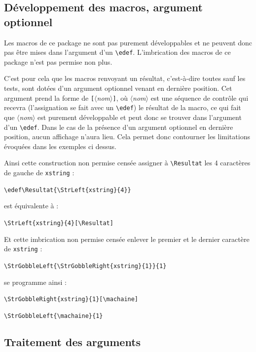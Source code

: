 \documentclass[a4paper,10pt,french]{article}
\newcommand\argu[1]{$\langle$\textit{#1}$\rangle$}
\newcommand\arguC[1]{\texttt{\color{black}[}\argu{#1}\texttt{\color{black}]}}
\begin{document}
\subsection{Développement des macros, argument optionnel}
\label{argumentoptionnel}
Les macros de ce package ne sont pas purement développables et ne peuvent donc pas être mises dans l'argument d'un \verb|\edef|. L'imbrication des macros de ce package n'est pas permise non plus.\medskip

C'est pour cela que les macros renvoyant un résultat, c'est-à-dire toutes sauf les tests, sont dotées d'un argument optionnel venant en dernière position. Cet argument prend la forme de \arguC{nom}, où \argu{nom} est une séquence de contrôle qui recevra (l'assignation se fait avec un \verb|\edef|) le résultat de la macro, ce qui fait que \argu{nom} est purement développable et peut donc se trouver dans l'argument d'un \verb|\edef|. Dans le cas de la présence d'un argument optionnel en dernière position, aucun affichage n'aura lieu. Cela permet donc contourner les limitations évoquées dans les exemples ci dessus.\medskip

Ainsi cette construction non permise censée assigner à \verb|\Resultat| les 4 caractères de gauche de \verb|xstring| :\par\nobreak
\hspace{0.2\linewidth}\verb|\edef\Resultat{\StrLeft{xstring}{4}}|\par\nobreak
\qquad est équivalente à :\par\nobreak
\hspace{0.2\linewidth}\verb|\StrLeft{xstring}{4}[\Resultat]|\medskip

Et cette imbrication non permise censée enlever le premier et le dernier caractère de \verb|xstring| :\par\nobreak
\hspace{0.2\linewidth}\verb|\StrGobbleLeft{\StrGobbleRight{xstring}{1}}{1}|\par\nobreak
\qquad se programme ainsi :\par\nobreak
\hspace{0.2\linewidth}\verb|\StrGobbleRight{xstring}{1}[\machaine]|\par\nobreak
\hspace{0.2\linewidth}\verb|\StrGobbleLeft{\machaine}{1}|\par

\subsection{Traitement des arguments}
\label{developpementarguments}
\end{document}
